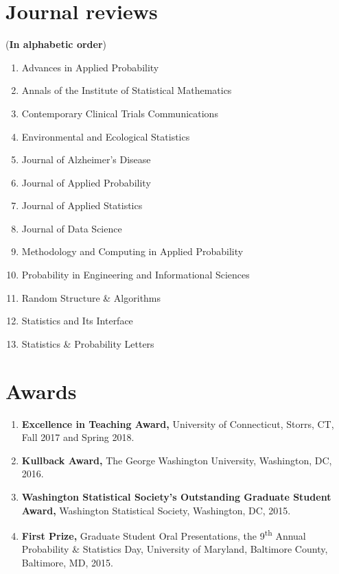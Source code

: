 \documentclass[margin]{res}
\begin{document}
\begin{resume}
\section{Journal reviews}
({\bf In alphabetic order})
\begin{enumerate}
	\item Advances in Applied Probability
	\item Annals of the Institute of Statistical Mathematics
	\item Contemporary Clinical Trials Communications
	\item Environmental and Ecological Statistics
	\item Journal of Alzheimer's Disease
	\item Journal of Applied Probability
	\item Journal of Applied Statistics 
	\item Journal of Data Science
	\item Methodology and Computing in Applied Probability
	\item Probability in Engineering and Informational Sciences
	\item Random Structure \& Algorithms
	\item Statistics and Its Interface
	\item Statistics \& Probability Letters
\end{enumerate}

\section{Awards}
\begin{enumerate}
	\item {\bf Excellence in Teaching Award,} University of Connecticut, Storrs, CT, Fall 2017 and Spring 2018.
	\item {\bf Kullback Award,} The George Washington University, Washington, DC, 2016.
	\item {\bf Washington Statistical Society's Outstanding Graduate Student Award,} Washington Statistical Society, Washington, DC, 2015.
	\item {\bf First Prize,} Graduate Student Oral Presentations, the 9\textsuperscript{th} Annual Probability \& Statistics Day,  University of Maryland, Baltimore County, Baltimore, MD, 2015.
\end{enumerate}
\end{resume} 
\end{document}

